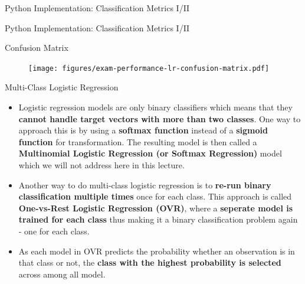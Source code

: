 \documentclass[document.tex]{subfiles}
\begin{document}
    \begin{frame}{Python Implementation: Classification Metrics I/II}
        
    \end{frame}

    \begin{frame}{Python Implementation: Classification Metrics I/II}
        
    \end{frame}

    \begin{frame}{Confusion Matrix}
        \begin{figure}
            \label{fig:exam-performance-lr-confusion-matrix}
            \texttt{[image: figures/exam-performance-lr-confusion-matrix.pdf]}
        \end{figure}        
    \end{frame}

    \begin{frame}{Multi-Class Logistic Regression}
        \begin{itemize}
            \item Logistic regression models are only binary classifiers which means that they \textbf{cannot handle target vectors with more than two classes}. One way to approach this is by using a \textbf{softmax function} instead of a \textbf{sigmoid function} for transformation. The resulting model is then called a \textbf{Multinomial Logistic Regression (or Softmax Regression)} model which we will not address here in this lecture.
            \item Another way to do multi-class logistic regression is to \textbf{re-run binary classification multiple times} once for each class. This approach is called \textbf{One-vs-Rest Logistic Regression (OVR)}, where a \textbf{seperate model is trained for each class} thus making it a binary classification problem again - one for each class.
            \item As each model in OVR predicts the probability whether an observation is in that class or not, the \textbf{class with the highest probability is selected} across among all model.
        \end{itemize}
    \end{frame}
\end{document}

